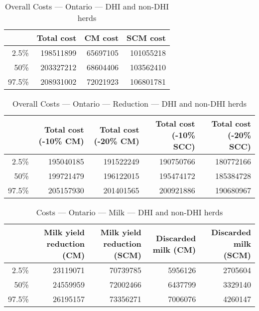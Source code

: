 \documentclass{article}\usepackage[]{graphicx}\usepackage[]{color}
\begin{document}
\begin{table}[ht]
\centering
\begin{tabular}{rrrr}
  \hline
 & Total cost & CM cost & SCM cost \\ 
  \hline
2.5\% & 198511899 & 65697105 & 101055218 \\ 
  50\% & 203327212 & 68604406 & 103562410 \\ 
  97.5\% & 208931002 & 72021923 & 106801781 \\ 
   \hline
\end{tabular}
\caption{Overall Costs --- Ontario --- DHI and non-DHI herds} 
\label{tab:ontario2:overall}
\end{table}
\begin{table}[ht]
\centering
\begin{tabular}{rrrrr}
  \hline
 & Total cost (-10\% CM) & Total cost (-20\% CM) & Total cost (-10\% SCC) & Total cost (-20\% SCC) \\ 
  \hline
2.5\% & 195040185 & 191522249 & 190750766 & 180772166 \\ 
  50\% & 199721479 & 196122015 & 195474172 & 185384728 \\ 
  97.5\% & 205157930 & 201401565 & 200921886 & 190680967 \\ 
   \hline
\end{tabular}
\caption{Overall Costs --- Ontario --- Reduction --- DHI and non-DHI herds} 
\label{tab:ontario2:reduction}
\end{table}
\begin{table}[ht]
\centering
\begin{tabular}{rrrrr}
  \hline
 & Milk yield reduction (CM) & Milk yield reduction (SCM) & Discarded milk (CM) & Discarded milk (SCM) \\ 
  \hline
2.5\% & 23119071 & 70739785 & 5956126 & 2705604 \\ 
  50\% & 24559959 & 72002466 & 6437799 & 3329140 \\ 
  97.5\% & 26195157 & 73356271 & 7006076 & 4260147 \\ 
   \hline
\end{tabular}
\caption{Costs --- Ontario --- Milk --- DHI and non-DHI herds} 
\label{tab:ontario2:a}
\end{table}
\end{document}
